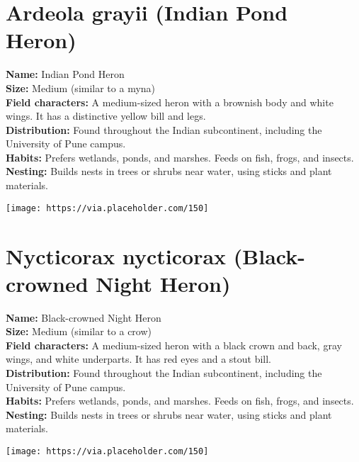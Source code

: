 \documentclass[a5paper,12pt]{memoir}
\begin{document}
\section*{Ardeola grayii (Indian Pond Heron)}
\textbf{Name:} Indian Pond Heron \\
\textbf{Size:} Medium (similar to a myna) \\
\textbf{Field characters:} A medium-sized heron with a brownish body and white wings. It has a distinctive yellow bill and legs. \\
\textbf{Distribution:} Found throughout the Indian subcontinent, including the University of Pune campus. \\
\textbf{Habits:} Prefers wetlands, ponds, and marshes. Feeds on fish, frogs, and insects. \\
\textbf{Nesting:} Builds nests in trees or shrubs near water, using sticks and plant materials. \\
\begin{flushright}
\texttt{[image: https://via.placeholder.com/150]}
\end{flushright}

\newpage

\section*{Nycticorax nycticorax (Black-crowned Night Heron)}
\textbf{Name:} Black-crowned Night Heron \\
\textbf{Size:} Medium (similar to a crow) \\
\textbf{Field characters:} A medium-sized heron with a black crown and back, gray wings, and white underparts. It has red eyes and a stout bill. \\
\textbf{Distribution:} Found throughout the Indian subcontinent, including the University of Pune campus. \\
\textbf{Habits:} Prefers wetlands, ponds, and marshes. Feeds on fish, frogs, and insects. \\
\textbf{Nesting:} Builds nests in trees or shrubs near water, using sticks and plant materials. \\
\begin{flushright}
\texttt{[image: https://via.placeholder.com/150]}
\end{flushright}

\newpage
\end{document}
